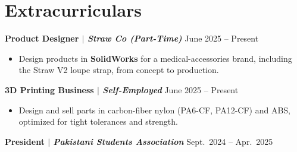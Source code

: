 \documentclass[11pt, letterpaper]{article}
\newcommand{\resumeEntry}[2]{%
  \noindent\textbf{#1} \hfill #2\vspace{0.5pt}
}
\newenvironment{resumelist}{%
  \begin{itemize}[leftmargin=1.5em, itemsep=0.5pt, topsep=1pt, parsep=0pt]
}{%
  \end{itemize}\vspace{0.5pt}
}
\begin{document}
\section{Extracurriculars}

\resumeEntry{Product Designer \textnormal{$|$ \itshape Straw Co (Part-Time)}}{June 2025 -- Present}
\begin{resumelist}
    \item Design products in \textbf{SolidWorks} for a medical-accessories brand, including the Straw V2 loupe strap, from concept to production.
\end{resumelist}
\resumeEntry{3D Printing Business \textnormal{$|$ \itshape Self-Employed}}{June 2025 -- Present}
\begin{resumelist}
    \item Design and sell parts in carbon-fiber nylon (PA6-CF, PA12-CF) and ABS, optimized for tight tolerances and strength.
\end{resumelist}
\resumeEntry{President \textnormal{$|$ \itshape Pakistani Students Association}}{Sept.~2024 -- Apr.~2025}
\end{document}
